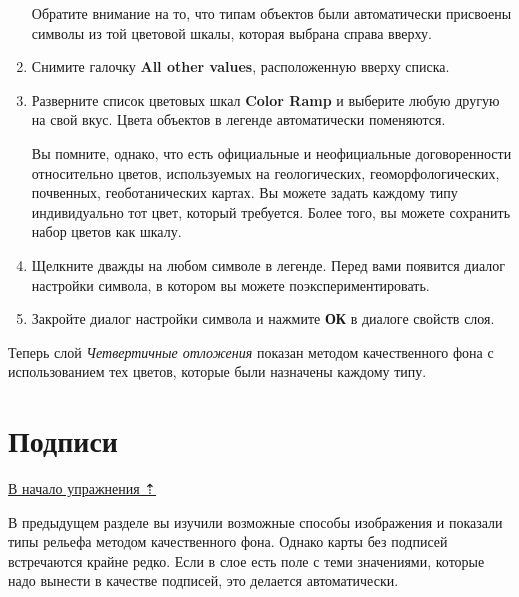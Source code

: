 \documentclass[12pt,]{book}
\begin{document}
\begin{enumerate}
  Обратите внимание на то, что типам объектов были автоматически присвоены символы из той цветовой шкалы, которая выбрана справа вверху.
\item
  Снимите галочку \textbf{All other values}, расположенную вверху списка.
\item
  Разверните список цветовых шкал \textbf{Color Ramp} и выберите любую другую на свой вкус. Цвета объектов в легенде автоматически поменяются.

  Вы помните, однако, что есть официальные и неофициальные договоренности относительно цветов, используемых на геологических, геоморфологических, почвенных, геоботанических картах. Вы можете задать каждому типу индивидуально тот цвет, который требуется. Более того, вы можете сохранить набор цветов как шкалу.
\item
  Щелкните дважды на любом символе в легенде. Перед вами появится диалог настройки символа, в котором вы можете поэкспериментировать.
\item
  Закройте диалог настройки символа и нажмите \textbf{ОК} в диалоге свойств слоя.
\end{enumerate}

Теперь слой \emph{Четвертичные отложения} показан методом качественного фона с использованием тех цветов, которые были назначены каждому типу.

\hypertarget{map-design-quaternary-labels}{%
\section{Подписи}\label{map-design-quaternary-labels}}

\protect\hyperlink{map-design-quaternary}{В начало упражнения ⇡}

В предыдущем разделе вы изучили возможные способы изображения и показали типы рельефа методом качественного фона. Однако карты без подписей встречаются крайне редко. Если в слое есть поле с теми значениями, которые надо вынести в качестве подписей, это делается автоматически.
\end{document}
